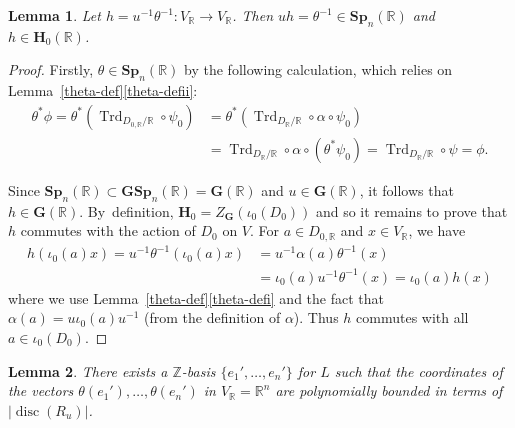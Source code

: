 \documentclass[11pt]{article}
\numberwithin{equation}{section}
\newcommand{\bR}{\mathbb{R}}
\newcommand{\bZ}{\mathbb{Z}}
\newcommand{\gG}{\mathbf{G}}
\newcommand{\gGSp}{\mathbf{GSp}}
\newcommand{\gH}{\mathbf{H}}
\newcommand{\gSp}{\mathbf{Sp}}
\DeclareMathOperator{\disc}{disc}
\DeclareMathOperator{\Trd}{Trd}
\newcommand{\abs}[1]{\lvert #1 \rvert}
\newtheorem{lemma}{Lemma}[section]
\begin{document}
\begin{lemma} \label{h-in-h0}
Let $h = u^{-1} \theta^{-1} \colon V_\bR \to V_\bR$.
Then $uh = \theta^{-1} \in \gSp_n(\bR)$ and $h \in \gH_0(\bR)$.
\end{lemma}

\begin{proof}
Firstly, $\theta \in \gSp_n(\bR)$ by the following calculation, which relies on Lem\-ma~\ref{theta-def}\eqref{theta-defii}:
\begin{align*}
\theta^* \phi
= \theta^*({\Trd_{D_{0,\bR}/\bR}} \circ \psi_0)
& = \theta^*({\Trd_{D_\bR/\bR}} \circ \alpha \circ \psi_0)
\\& = {\Trd_{D_\bR/\bR}} \circ \alpha \circ (\theta^* \psi_0)
= {\Trd_{D_\bR/\bR}} \circ \psi
= \phi.
\end{align*}

Since $\gSp_n(\bR) \!\subset\! \gGSp_n(\bR) = \gG(\bR)$ and $u \!\in\! \gG(\bR)$, it follows that $h \!\in\! \gG(\bR)$.
By~definition, $\gH_0 = Z_\gG(\iota_0(D_0))$ and so it remains to prove that $h$ commutes with the action of $D_0$ on $V$.
For $a \in D_{0,\bR}$ and $x \in V_\bR$, we have
\begin{align*}
h(\iota_0(a)x)
= u^{-1} \theta^{-1} (\iota_0(a)x)
& = u^{-1} \alpha(a) \theta^{-1}(x)
\\& = \iota_0(a) u^{-1} \theta^{-1}(x)
= \iota_0(a)h(x)
\end{align*}
where we use Lemma~\ref{theta-def}\eqref{theta-defi} and the fact that $\alpha(a) = u\iota_0(a)u^{-1}$ (from the definition of $\alpha$).
Thus $h$ commutes with all $a \in \iota_0(D_0)$.
\end{proof}

\begin{lemma} \label{z-basis-bound}
There exists a $\bZ$-basis $\{ e_1', \dotsc, e_n' \}$ for $L$ such that the coordinates of the vectors $\theta(e_1'), \dotsc, \theta(e_n')$ in $V_\bR = \bR^n$ are polynomially bounded in terms of $\abs{\disc(R_u)}$.
\end{lemma}
\end{document}
